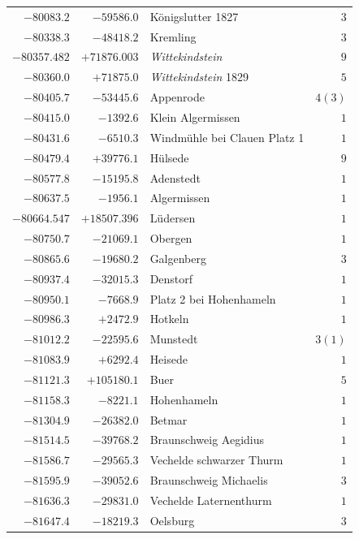 \begin{center}
\begin{tabular}{r|r|p{170pt}|r}
\(-80083.2\)&\(-59586.0\)&Königslutter 1827&\(3\)\\
\(-80338.3\)&\(-48418.2\)&Kremling&\(3\)\\
\(-80357.482\)&\(+71876.003\)&\textit{Wittekindstein}&\(9\)\\
\(-80360.0\)&\(+71875.0\)&\textit{Wittekindstein} 1829&\(5\)\\
\(-80405.7\)&\(-53445.6\)&Appenrode&\(4 (3)\)\\
\(-80415.0\)&\(-1392.6\)&Klein Algermissen&\(1\)\\
\(-80431.6\)&\(-6510.3\)&Windmühle bei Clauen Platz 1&\(1\)\\
\(-80479.4\)&\(+39776.1\)&Hülsede&\(9\)\\
\(-80577.8\)&\(-15195.8\)&Adenstedt&\(1\)\\
\(-80637.5\)&\(-1956.1\)&Algermissen&\(1\)\\
\(-80664.547\)&\(+18507.396\)&Lüdersen&\(1\)\\
\(-80750.7\)&\(-21069.1\)&Obergen&\(1\)\\
\(-80865.6\)&\(-19680.2\)&Galgenberg&\(3\)\\
\(-80937.4\)&\(-32015.3\)&Denstorf&\(1\)\\
\(-80950.1\)&\(-7668.9\)&Platz 2 bei Hohenhameln&\(1\)\\
\(-80986.3\)&\(+2472.9\)&Hotkeln&\(1\)\\
\(-81012.2\)&\(-22595.6\)&Munstedt&\(3 (1)\)\\
\(-81083.9\)&\(+6292.4\)&Heisede&\(1\)\\
\(-81121.3\)&\(+105180.1\)&Buer&\(5\)\\
\(-81158.3\)&\(-8221.1\)&Hohenhameln&\(1\)\\
\(-81304.9\)&\(-26382.0\)&Betmar&\(1\)\\
\(-81514.5\)&\(-39768.2\)&Braunschweig Aegidius&\(1\)\\
\(-81586.7\)&\(-29565.3\)&Vechelde schwarzer Thurm&\(1\)\\
\(-81595.9\)&\(-39052.6\)&Braunschweig Michaelis&\(3\)\\
\(-81636.3\)&\(-29831.0\)&Vechelde Laternenthurm&\(1\)\\
\(-81647.4\)&\(-18219.3\)&Oelsburg&\(3\)\\
\hline\end{tabular}\endgroup\end{center}

